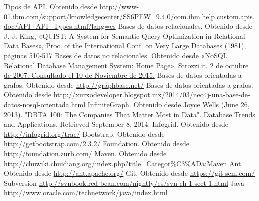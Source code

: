\begin{thebibliography}{99}
   Tipos de API. Obtenido desde \url{http://www-01.ibm.com/support/knowledgecenter/SS6PEW_9.4.0/com.ibm.help.custom.apis.doc/API_API_Types.html?lang=es}
   Bases de datos relacionales. Obtenido desde J. J. King, «QUIST: A System for Semantic Query Optimization in Relational Data Bases», Proc. of the International Conf. on Very Large Databases (1981),
páginas 510-517
   Bases de datos no relacionales. Obtenido desde \url{ «NoSQL Relational Database Management System: Home Page». Strozzi.it. 2 de octubre de 2007. Consultado el 10 de Noviembre de 2015.}
   Bases de datos orientadas a grafos. Obtenido desde \url{ http://graphbase.net/}
   Bases de datos orientadas a grafos. Obtenido desde \url{ http://xurxodeveloper.blogspot.mx/2014/03/neo4j-una-base-de-datos-nosql-orientada.html}
   InfiniteGraph. Obtenido desde  Joyce Wells (June 26, 2013). "DBTA 100: The Companies That Matter Most in Data". Database Trends and Applications. Retrieved September 8, 2014.
   Infogrid. Obtenido desde  \url{http://infogrid.org/trac/}
   Bootstrap. Obtenido desde  \url{http://getbootstrap.com/2.3.2/}
   Foundation. Obtenido desde  \url{http://foundation.zurb.com/}
   Maven. Obtenido desde  \url{http://chuwiki.chuidiang.org/index.php?title=Categor%C3%ADa:Maven}
   Ant. Obtenido desde  \url{http://ant.apache.org/}
   Git. Obtenido desde  \url{https://git-scm.com/}
   Subversion \url{http://svnbook.red-bean.com/nightly/es/svn-ch-1-sect-1.html}
   Java \url{http://www.oracle.com/technetwork/java/index.html}

\end{thebibliography}


